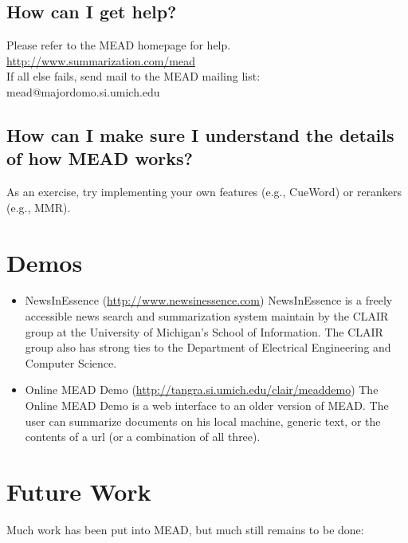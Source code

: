 \documentclass[10pt]{article}
\begin{document}
\subsection{How can I get help?}

Please refer to the MEAD homepage for help.\\

 \url{http://www.summarization.com/mead}\\

\noindent
If all else fails, send mail to the MEAD mailing list:\\

 mead@majordomo.si.umich.edu

\subsection{How can I make sure I understand the details of how MEAD works?}

As an exercise, try implementing your own features (e.g., CueWord) or
rerankers (e.g., MMR).

\section{Demos}

\begin{itemize}

\item NewsInEssence (\url{http://www.newsinessence.com})
  NewsInEssence is a freely accessible news search and summarization
  system maintain by the CLAIR group at the University of Michigan's
  School of Information.  The CLAIR group also has strong ties to
  the Department of Electrical Engineering and Computer Science.

\item Online MEAD Demo (\url{http://tangra.si.umich.edu/clair/meaddemo})
  The Online MEAD Demo is a web interface to an older version of MEAD.  
  The user can summarize documents on his local machine,
  generic text, or the contents of a url (or a combination
  of all three).

\end{itemize}






\section{Future Work}

Much work has been put into MEAD, but much still remains to be done:
\end{document}
